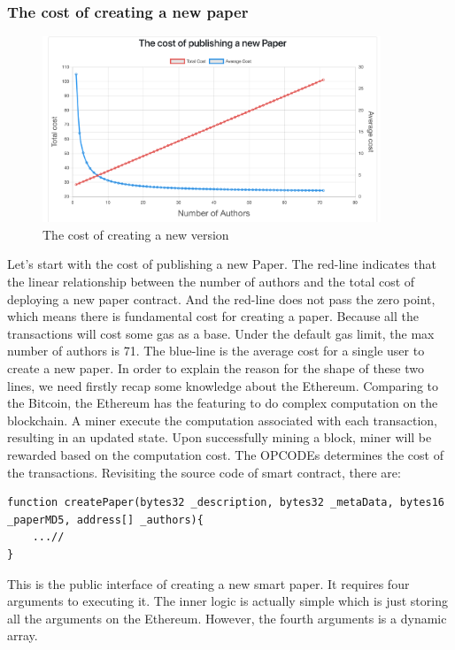 \documentclass[openany,12pt]{ecsthesis}      %
\begin{document}
\subsubsection{The cost of creating a new paper}
\begin{figure}[H]
  \centering
  \includegraphics[width=0.9\textwidth]{papercost.png}
  \caption{The cost of creating a new version}
  \label{papercost}
\end{figure}
Let's start with the cost of publishing a new Paper. 
The red-line indicates that the linear relationship between the number of authors and the total cost of deploying a new paper contract. And the red-line does not pass the zero point, 
which means there is fundamental cost for creating a paper. Because all the transactions will cost some gas as a base.
Under the default gas limit, the max number of authors is 71. The blue-line is the average cost for a single user to create a new paper.
In order to explain the reason for the shape of these two lines, we need firstly recap some knowledge about the Ethereum. 
Comparing to the Bitcoin, the Ethereum has the featuring to do complex computation on the blockchain. 
A miner execute the computation associated with each transaction, resulting in an updated state. Upon successfully mining a block, miner will be rewarded based on the computation cost.
The OPCODEs determines the cost of the transactions. Revisiting the source code of smart contract, there are:
\begin{lstlisting}[language=Solidity]
  function createPaper(bytes32 _description, bytes32 _metaData, bytes16 _paperMD5, address[] _authors){
    ...//
}
\end{lstlisting}
This is the public interface of creating a new smart paper. It requires four arguments to executing it. 
The inner logic is actually simple which is just storing all the arguments on the Ethereum. 
However, the fourth arguments is a dynamic array. 
\end{document}
